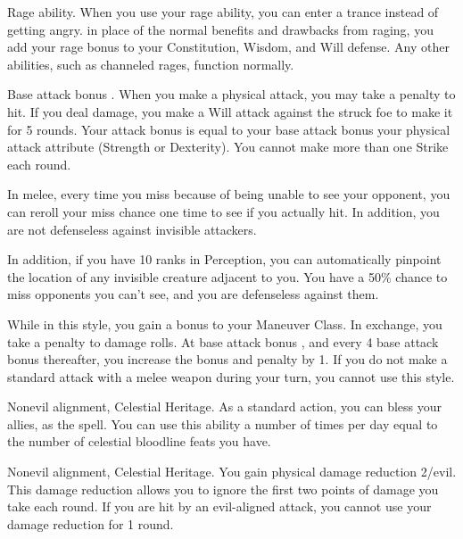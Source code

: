 \featpre Rage ability.
\featben When you use your rage ability, you can enter a trance instead of getting angry. in place of the normal benefits and drawbacks from raging, you add your rage bonus to your Constitution, Wisdom, and Will defense. Any other abilities, such as channeled rages, function normally.

\featpre Base attack bonus .
\featben When you make a physical attack, you may take a  penalty to hit. If you deal damage, you make a Will attack against the struck foe to make it \bewildered for 5 rounds. Your attack bonus is equal to your base attack bonus \add your physical attack attribute (Strength or Dexterity). You cannot make more than one Strike each round.

 In melee, every time you miss because of being unable to see your opponent, you can reroll your miss chance one time to see if you actually hit. In addition, you are not defenseless against invisible attackers.
\par In addition, if you have 10 ranks in Perception, you can automatically pinpoint the location of any invisible creature adjacent to you.
 You have a 50\% chance to miss opponents you can't see, and you are defenseless against them.

 While in this style, you gain a  bonus to your Maneuver Class. In exchange, you take a  penalty to damage rolls. At base attack bonus , and every 4 base attack bonus thereafter, you increase the bonus and penalty by 1. If you do not make a standard attack with a melee weapon during your turn, you cannot use this style.

 Nonevil alignment, Celestial Heritage.
 As a standard action, you can bless your allies, as the  spell. You can use this ability a number of times per day equal to the number of celestial bloodline feats you have.

 Nonevil alignment, Celestial Heritage.
 You gain physical damage reduction 2/evil. This damage reduction allows you to ignore the first two points of damage you take each round. If you are hit by an evil-aligned attack, you cannot use your damage reduction for 1 round.

